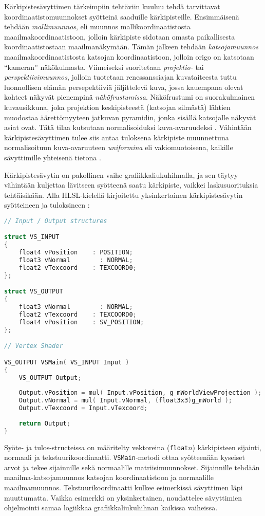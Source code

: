 \documentclass[finnish]{tktltiki2}
\theoremstyle{definition}
\theoremstyle{remark}
\begin{document}
Kärkipistesävyttimen tärkeimpiin tehtäviin kuuluu tehdä tarvittavat koordinaatistomuunnokset syötteinä saaduille kärkipisteille. Ensimmäisenä tehdään \emph{mallimuunnos}, eli muunnos mallikoordinaatistosta maailmakoordinaatistoon, jolloin kärkipiste sidotaan omasta paikallisesta koordinaatistostaan maailmanäkymään. Tämän jälkeen tehdään \emph{katsojamuunnos} maailmakoordinaatistosta katsojan koordinaatistoon, jolloin origo on katsotaan ``kameran'' näkökulmasta. Viimeiseksi suoritetaan \emph{projektio-} tai \emph{perspektiivimuunnos}, jolloin tuotetaan renessanssiajan kuvataiteesta tuttu luonnollisen elämän persepektiiviä jäljittelevä kuva, jossa kauempana olevat kohteet näkyvät pienempinä \emph{näköfrustumissa}. Näköfrustumi on suorakulmainen kuvausikkuna, joka projektion keskipisteestä (katsojan silmästä) lähtien muodostaa äärettömyyteen jatkuvan pyramidin, jonka sisällä katsojalle näkyvät asiat ovat. Tätä tilaa kutsutaan normalisoiduksi kuva-avaruudeksi \cite{Puh08}. Vähintään kärkipistesävyttimen tulee siis antaa tuloksena kärkipiste muunnettuna normalisoituun kuva-avaruuteen \emph{uniformina} eli vakiomuotoisena, kaikille sävyttimille yhteisenä tietona \cite{Puh08}.

Kärkipistesävytin on pakollinen vaihe grafiikkaliukuhihnalla, ja sen täytyy vähintään kuljettaa lävitseen syötteenä saatu kärkipiste, vaikkei laskusuorituksia tehtäisikään. Alla HLSL-kielellä kirjoitettu yksinkertainen kärkipistesävytin syötteineen ja tuloksineen \cite{Mic11}:
\lstset{breaklines=true}
\begin{lstlisting}[language=c, basicstyle=\footnotesize]
// Input / Output structures

struct VS_INPUT
{
    float4 vPosition    : POSITION;
    float3 vNormal        : NORMAL;
    float2 vTexcoord    : TEXCOORD0;
};

struct VS_OUTPUT
{
    float3 vNormal        : NORMAL;
    float2 vTexcoord    : TEXCOORD0;
    float4 vPosition    : SV_POSITION;
};

// Vertex Shader

VS_OUTPUT VSMain( VS_INPUT Input )
{
    VS_OUTPUT Output;
    
    Output.vPosition = mul( Input.vPosition, g_mWorldViewProjection );
    Output.vNormal = mul( Input.vNormal, (float3x3)g_mWorld );
    Output.vTexcoord = Input.vTexcoord;
    
    return Output;
}
\end{lstlisting}

Syöte- ja tulos-structeissa on määritelty vektoreina (\texttt{float}$n$) kärkipisteen sijainti, normaali ja tekstuurikoordinaatti. \texttt{VSMain}-metodi ottaa syötteenään kyseiset arvot  ja tekee sijainnille sekä normaalille matriisimuunnokset. Sijainnille tehdään maailma-katsojamuunnos katsojan koordinaatistoon ja normaalille maailmamuunnos. Tekstuurikoordinaatti kulkee esimerkissä sävyttimen läpi muuttumatta. Vaikka esimerkki on yksinkertainen, noudattelee sävyttimien ohjelmointi samaa logiikkaa grafiikkaliukuhihnan kaikissa vaiheissa.
\end{document}
